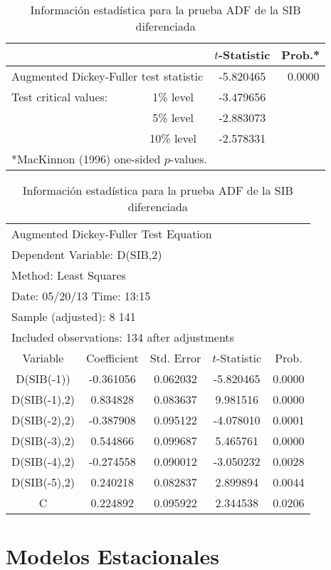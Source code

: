 \begin{ejemplo}
\begin{table}[H]
\centering\small
\caption{Informaci\'{o}n estad\'{i}stica para la prueba ADF de la SIB diferenciada}
\begin{tabular}{lccc}
\toprule
& & $t$-Statistic& Prob.* \\
\midrule
\multicolumn{2}{l}{Augmented Dickey-Fuller test statistic} &  
-5.820465& ~0.0000 \\
Test critical values:& 1{\%} level&  -3.479656&  \\
& 5{\%} level& -2.883073&  \\
& 10{\%} level& -2.578331&  \\
\bottomrule
\multicolumn{4}{l}{*MacKinnon (1996) one-sided $p$-values.}
\end{tabular}

\vspace{8mm}
\begin{tabular}{ccccc}
\multicolumn{4}{l}{Augmented Dickey-Fuller Test Equation}  \\
\multicolumn{4}{l}{Dependent Variable: D(SIB,2)} \\
\multicolumn{4}{l}{Method: Least Squares} \\
\multicolumn{4}{l}{Date: 05/20/13 Time: 13:15} \\
\multicolumn{4}{l}{Sample (adjusted): 8 141}  \\
\multicolumn{4}{l}{Included observations: 134 after adjustments}  \\
\toprule
Variable& Coefficient& Std. Error& $t$-Statistic& Prob. \\
\midrule
D(SIB(-1))& -0.361056& 0.062032& -5.820465& 0.0000 \\
D(SIB(-1),2)& 0.834828& 0.083637& 9.981516& 0.0000 \\
D(SIB(-2),2)& -0.387908& 0.095122& -4.078010& 0.0001 \\
D(SIB(-3),2)& 0.544866& 0.099687& 5.465761& 0.0000 \\
D(SIB(-4),2)& -0.274558& 0.090012& -3.050232& 0.0028 \\
D(SIB(-5),2)& 0.240218& 0.082837& 2.899894& 0.0044 \\
C& 0.224892& 0.095922& 2.344538& 0.0206 \\
\bottomrule
\end{tabular}
\end{table}

\end{ejemplo}



\section{Modelos Estacionales}

